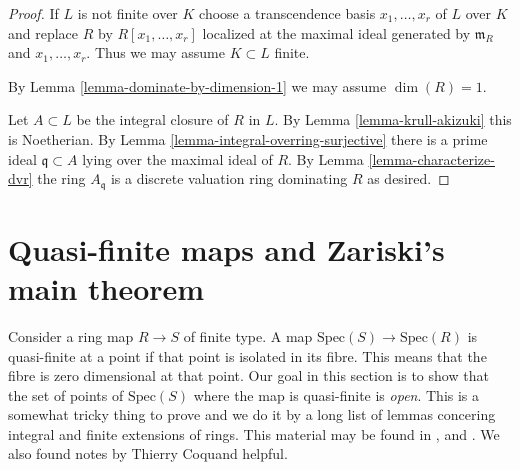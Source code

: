 \begin{proof}
If $L$ is not finite over $K$ choose a transcendence basis
$x_1, \ldots, x_r$ of $L$ over $K$ and replace $R$ by
$R[x_1, \ldots, x_r]$ localized at the maximal ideal
generated by $\mathfrak m_R$ and $x_1, \ldots, x_r$.
Thus we may assume $K \subset L$ finite.

\medskip\noindent
By Lemma \ref{lemma-dominate-by-dimension-1} we may assume $\dim(R) = 1$.

\medskip\noindent
Let $A \subset L$ be the integral closure of $R$ in $L$.
By Lemma \ref{lemma-krull-akizuki} this is Noetherian.
By Lemma \ref{lemma-integral-overring-surjective} there
is a prime ideal $\mathfrak q \subset A$ lying
over the maximal ideal of $R$.
By Lemma \ref{lemma-characterize-dvr} the ring $A_{\mathfrak q}$ is a discrete
valuation ring dominating $R$ as desired.
\end{proof}
















\section{Quasi-finite maps and Zariski's main theorem}
\label{section-Zariski}

\noindent
Consider a ring map $R \to S$ of finite type.
A map $\text{Spec}(S) \to \text{Spec}(R)$ is quasi-finite
at a point if that point is isolated in its fibre.
This means that the fibre is zero dimensional at that point.
Our goal in this section is to show that the set
of points of $\text{Spec}(S)$ where the map is quasi-finite
is {\it open}. This is a somewhat tricky thing to prove and
we do it by a long list of lemmas concering integral and
finite extensions of rings. This material may be found
in \cite{Henselian}, and \cite{Peskine}. We also found notes
by Thierry Coquand helpful.

